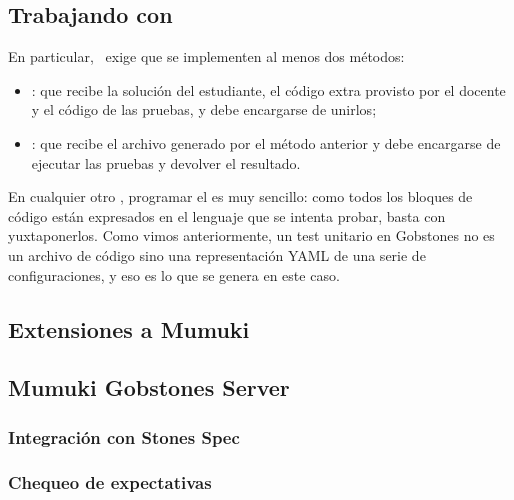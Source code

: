 
\subsection{Trabajando con \mumukit}
En particular, \mumukit\ exige que se implementen al menos dos métodos:
\begin{itemize}
  \item{: que recibe la solución del estudiante, el código extra provisto por el docente y el código de las pruebas, y debe encargarse de unirlos;}
  \item{: que recibe el archivo generado por el método anterior y debe encargarse de ejecutar las pruebas y devolver el resultado.}
\end{itemize}

En cualquier otro \runner, programar el  es muy sencillo: como todos los bloques de código están expresados en el lenguaje que se intenta probar, basta con yuxtaponerlos. Como vimos anteriormente, un test unitario en Gobstones no es un archivo de código sino una representación YAML de una serie de configuraciones, y eso es lo que se genera en este caso.

\subsection{Extensiones a Mumuki}

\subsection{Mumuki Gobstones Server}
\subsubsection{Integración con Stones Spec}
\subsubsection{Chequeo de expectativas}
